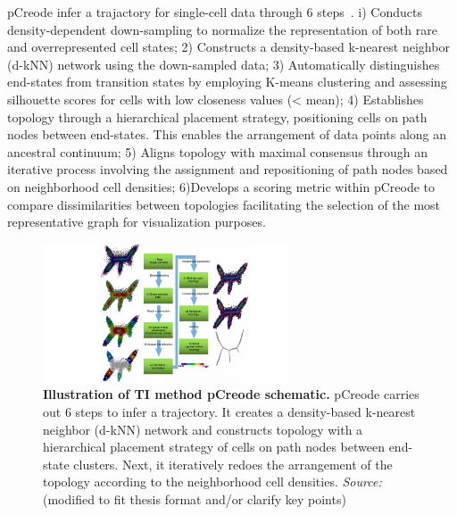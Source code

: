 \begin{description}
  pCreode infer a trajactory for single-cell data through 6 steps~\citep{herring2018pCreode}. i) Conducts density-dependent down-sampling to normalize the representation of both rare and overrepresented cell states; 2) Constructs a density-based k-nearest neighbor (d-kNN) network using the down-sampled data; 3) Automatically distinguishes end-states from transition states by employing K-means clustering and assessing silhouette scores for cells with low closeness values (< mean); 4) Establishes topology through a hierarchical placement strategy, positioning cells on path nodes between end-states. This enables the arrangement of data points along an ancestral continuum; 5) Aligns topology with maximal consensus through an iterative process involving the assignment and repositioning of path nodes based on neighborhood cell densities; 6)Develops a scoring metric within pCreode to compare dissimilarities between topologies facilitating the selection of the most representative graph for visualization purposes.
  \begin{figure}[ht!]
  	\centering
  	\includegraphics[width=0.65\textwidth]{TI_Alg_pCreode/fig}
  	\vspace{0.1cm}
  	\caption[Illustration of TI method pCreode schematic.]{\textbf{Illustration of TI method pCreode schematic.} pCreode carries out 6 steps to infer a trajectory. It creates a density-based k-nearest neighbor (d-kNN) network and constructs topology with a hierarchical placement strategy of cells on path nodes between end-state clusters. Next, it iteratively redoes the arrangement of the topology according to the neighborhood cell densities. \emph{Source:~\cite{herring2018pCreode}} (modified to fit thesis format and/or clarify key points)
  	}
  	\label{fig:TI_Alg_pCreode}
  \end{figure}


\end{description}
